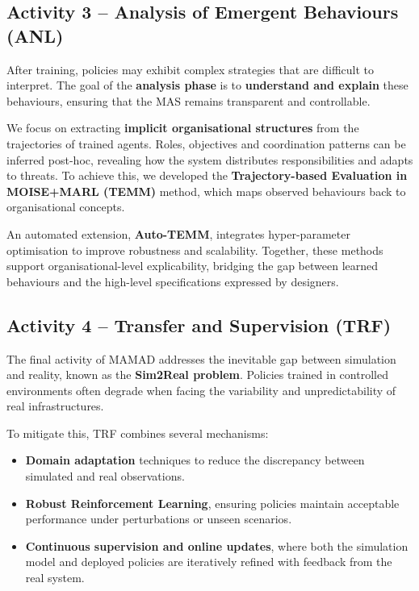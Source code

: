 \documentclass[a4paper,10pt,twocolumn]{article}
\begin{document}
\subsection*{Activity 3 – Analysis of Emergent Behaviours (ANL)}

After training, policies may exhibit complex strategies that are
difficult to interpret. The goal of the \textbf{analysis phase} is to
\textbf{understand and explain} these behaviours, ensuring that the MAS
remains transparent and controllable.

We focus on extracting \textbf{implicit organisational structures} from
the trajectories of trained agents. Roles, objectives and coordination
patterns can be inferred post-hoc, revealing how the system distributes
responsibilities and adapts to threats. To achieve this, we developed
the \textbf{Trajectory-based Evaluation in MOISE+MARL (TEMM)} method,
which maps observed behaviours back to organisational concepts.

An automated extension, \textbf{Auto-TEMM}, integrates hyper-parameter
optimisation to improve robustness and scalability. Together, these
methods support organisational-level explicability, bridging the gap
between learned behaviours and the high-level specifications expressed
by designers.



\subsection*{Activity 4 – Transfer and Supervision (TRF)}

The final activity of MAMAD addresses the inevitable gap between
simulation and reality, known as the \textbf{Sim2Real problem}.
Policies trained in controlled environments often degrade when facing
the variability and unpredictability of real infrastructures.

To mitigate this, TRF combines several mechanisms:
\begin{itemize}
    \item \textbf{Domain adaptation} techniques to reduce the discrepancy
          between simulated and real observations.
    \item \textbf{Robust Reinforcement Learning}, ensuring policies
          maintain acceptable performance under perturbations or unseen
          scenarios.
    \item \textbf{Continuous supervision and online updates}, where
          both the simulation model and deployed policies are iteratively
          refined with feedback from the real system.
\end{itemize}
\end{document}
